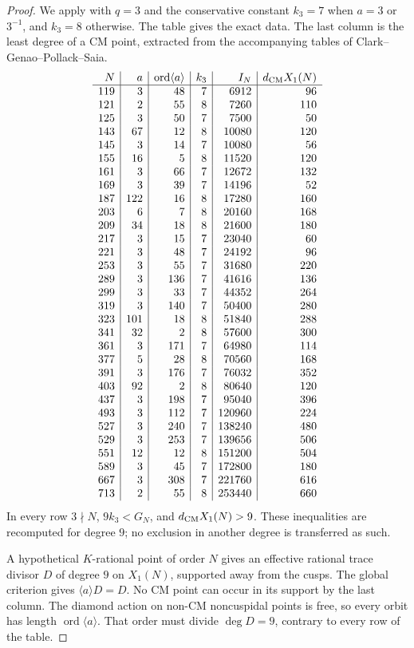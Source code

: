 \begin{proof}
We apply \cite[Proposition~4.4]{DN} with $q=3$ and the conservative
constant $k_3=7$ when $a=3$ or $3^{-1}$, and $k_3=8$ otherwise.
The table gives the exact data. The last column is the least degree
of a CM point, extracted from the accompanying tables of
Clark--Genao--Pollack--Saia.
\[
\begin{array}{r|r|r|r|r|r}
 N&a&\operatorname{ord}\langle a\rangle&k_3&I_N&d_{\rm CM}X_1(N)\\\hline
119&3&48&7&6912&96\\
121&2&55&8&7260&110\\
125&3&50&7&7500&50\\
143&67&12&8&10080&120\\
145&3&14&7&10080&56\\
155&16&5&8&11520&120\\
161&3&66&7&12672&132\\
169&3&39&7&14196&52\\
187&122&16&8&17280&160\\
203&6&7&8&20160&168\\
209&34&18&8&21600&180\\
217&3&15&7&23040&60\\
221&3&48&7&24192&96\\
253&3&55&7&31680&220\\
289&3&136&7&41616&136\\
299&3&33&7&44352&264\\
319&3&140&7&50400&280\\
323&101&18&8&51840&288\\
341&32&2&8&57600&300\\
361&3&171&7&64980&114\\
377&5&28&8&70560&168\\
391&3&176&7&76032&352\\
403&92&2&8&80640&120\\
437&3&198&7&95040&396\\
493&3&112&7&120960&224\\
527&3&240&7&138240&480\\
529&3&253&7&139656&506\\
551&12&12&8&151200&504\\
589&3&45&7&172800&180\\
667&3&308&7&221760&616\\
713&2&55&8&253440&660\\
\end{array}
\]
In every row $3\nmid N$, $9k_3<G_N$, and $d_{\rm CM}X_1(N)>9$.
These inequalities are recomputed for degree $9$; no exclusion in
another degree is transferred as such.

A hypothetical $K$-rational point of order $N$ gives an effective
rational trace divisor $D$ of degree $9$ on $X_1(N)$, supported away
from the cusps. The global criterion gives
$\langle a\rangle D=D$. No CM point can occur in its support by the
last column. The diamond action on non-CM noncuspidal points is free,
so every orbit has length $\operatorname{ord}\langle a\rangle$.
That order must divide $\deg D=9$, contrary to every row of the table.
\end{proof}
